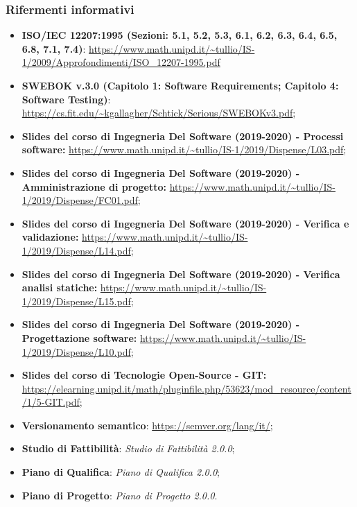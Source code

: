 \subsubsection{Rifermenti informativi}
\begin{itemize}
  \item \textbf{ISO/IEC 12207:1995 (Sezioni: 5.1, 5.2, 5.3, 6.1, 6.2, 6.3, 6.4, 6.5, 6.8,  7.1,  7.4)}: \url{https://www.math.unipd.it/~tullio/IS-1/2009/Approfondimenti/ISO_12207-1995.pdf}
  \item \textbf{SWEBOK v.3.0 (Capitolo 1: Software Requirements; Capitolo 4: Software Testing)}: \url{https://cs.fit.edu/~kgallagher/Schtick/Serious/SWEBOKv3.pdf};
  \item \textbf{Slides del corso di Ingegneria Del Software (2019-2020) - Processi software:} \url{https://www.math.unipd.it/~tullio/IS-1/2019/Dispense/L03.pdf};
  \item \textbf{Slides del corso di Ingegneria Del Software (2019-2020) - Amministrazione di progetto:} \url{https://www.math.unipd.it/~tullio/IS-1/2019/Dispense/FC01.pdf};
  \item \textbf{Slides del corso di Ingegneria Del Software (2019-2020) - Verifica e validazione:} \url{https://www.math.unipd.it/~tullio/IS-1/2019/Dispense/L14.pdf};
  \item \textbf{Slides del corso di Ingegneria Del Software (2019-2020) - Verifica analisi statiche:} \url{https://www.math.unipd.it/~tullio/IS-1/2019/Dispense/L15.pdf};
  \item \textbf{Slides del corso di Ingegneria Del Software (2019-2020) - Progettazione software:}
  \url{  https://www.math.unipd.it/~tullio/IS-1/2019/Dispense/L10.pdf};
  \item \textbf{Slides del corso di Tecnologie Open-Source - GIT:}   \url{  https://elearning.unipd.it/math/pluginfile.php/53623/mod_resource/content/1/5-GIT.pdf};
  \item \textbf{Versionamento semantico}: \url{https://semver.org/lang/it/;}
  \item \textbf{Studio di Fattibilità}: \textit{Studio di Fattibilità 2.0.0\docs};
  \item \textbf{Piano di Qualifica}: \textit{Piano di Qualifica 2.0.0\docs};
  \item \textbf{Piano di Progetto}: \textit{Piano di Progetto 2.0.0\docs}.
\end{itemize}
